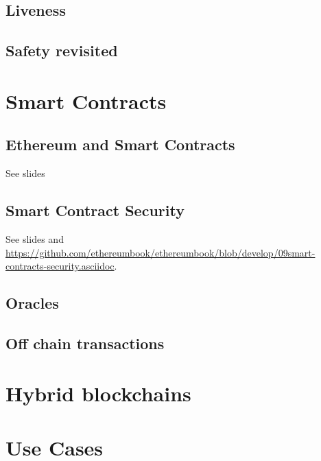 \documentclass[a4paper,11pt]{report}
\begin{document}
	\section{Liveness}
	\label{sec:live}
	
	
	\section{Safety revisited}
	\label{sec:safe2}
	

\chapter{Smart Contracts}

	\section{Ethereum and Smart Contracts}
	See slides 

	\section{Smart Contract Security}
	See slides and \url{https://github.com/ethereumbook/ethereumbook/blob/develop/09smart-contracts-security.asciidoc}.
	
	\section{Oracles}
	
	\section{Off chain transactions}

\chapter{Hybrid blockchains}
	\label{ch:hybrid}
	

\chapter{Use Cases}
	\label{ch:useCases}
	
\end{document}
